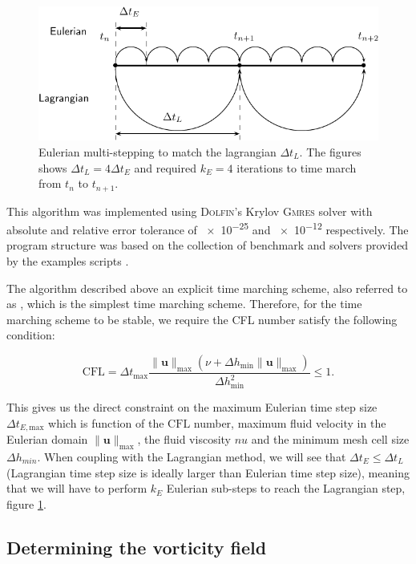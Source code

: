	\begin{figure}[t]
	\centering
	\includegraphics[width=0.7\linewidth]{./figures/eulerian/multiStep-crop.pdf}
	\caption{Eulerian multi-stepping to match the lagrangian $\Delta t_L$. The figures shows $\Delta t_L = 4 \Delta t_E$ and required $k_E = 4$ iterations to time march from $t_n$ to $t_{n+1}$.}
	\label{fig:multiStep}
	\end{figure}
	
	
This algorithm was implemented using \textsc{Dolfin}'s Krylov \textsc{Gmres} solver with absolute and relative error tolerance of \num{e-25} and \num{e-12} respectively. The program structure was based on the collection of benchmark and solvers provided by the \fenics examples scripts \cite{nsbench}.

The algorithm described above an explicit time marching scheme, also referred to as , which is the simplest time marching scheme. Therefore, for the time marching scheme to be stable, we require the CFL number satisfy the following condition:

	\begin{equation}
	\mathrm{CFL} = \Delta t_{\mathrm{max}} \frac{\lVert\mathbf{u}\rVert_{\mathrm{max}}(\nu +  \Delta h_{\mathrm{min}}\lVert\mathbf{u}\rVert_{\mathrm{max}})}{\Delta h_{\mathrm{min}}^2} \le 1.
	\end{equation}
	
This gives us the direct constraint on the maximum Eulerian time step size $\Delta t_{E,\mathrm{max}}$ which is function of the $\mathrm{CFL}$ number, maximum fluid velocity in the Eulerian domain $\lVert \mathbf{u} \rVert_{\mathrm{max}}$, the fluid viscosity $nu$ and the minimum mesh cell size $\Delta h_{min}$. When coupling with the Lagrangian method, we will see that $\Delta t_E \le \Delta t_L$ (Lagrangian time step size is ideally larger than Eulerian time step size), meaning that we will have to perform $k_E$ Eulerian sub-steps to reach the Lagrangian step, figure \ref{fig:multiStep}.

\subsection{Determining the vorticity field}

